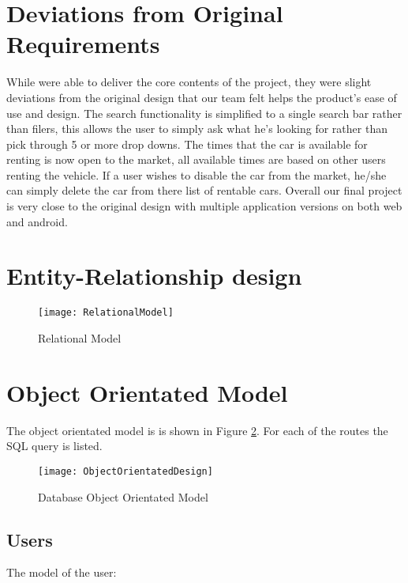 \documentclass{article}
\begin{document}
\section{Deviations from Original Requirements}
While were able to deliver the core contents of the project, they were slight deviations from the original design that
our team felt helps the product's ease of use and design. The search functionality is simplified to a single search bar rather than filers,
this allows the user to simply ask what he's looking for rather than pick through 5 or more drop downs. The times that the car is available for renting
is now open to the market, all available times are based on other users renting the vehicle. If a user wishes to disable the car from the market, he/she can
simply delete the car from there list of rentable cars. Overall our final project is very close to the original design with multiple application versions on both
web and android.

\section{Entity-Relationship design}
\begin{figure}[ht!]
    \centering
    \texttt{[image: RelationalModel]}
    \caption{Relational Model}
    \label{fig:relationalmodel}
\end{figure}

\section{Object Orientated Model}
The object orientated model is is shown in Figure \ref{fig:oomodel}. For each of the
routes the SQL query is listed.
\begin{figure}[ht!]
    \centering
    \texttt{[image: ObjectOrientatedDesign]}
    \caption{Database Object Orientated Model}
    \label{fig:oomodel}
\end{figure}
\subsection{Users}
The model of the user:
\end{document}
